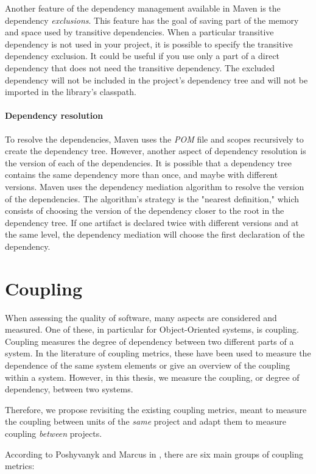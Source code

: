 Another feature of the dependency management available in Maven is the dependency \textit{exclusions}. This feature has the goal of saving part of the memory and space used by transitive dependencies. When a particular transitive dependency is not used in your project, it is possible to specify the transitive dependency exclusion. It could be useful if you use only a part of a direct dependency that does not need the transitive dependency. The excluded dependency will not be included in the project's dependency tree and will not be imported in the library's classpath.

\paragraph{Dependency resolution}
To resolve the dependencies, Maven uses the \textit{POM} file and scopes recursively to create the dependency tree. However, another aspect of dependency resolution is the version of each of the dependencies. It is possible that a dependency tree contains the same dependency more than once, and maybe with different versions. Maven uses the dependency mediation algorithm to resolve the version of the dependencies. The algorithm's strategy is the "nearest definition," which consists of choosing the version of the dependency closer to the root in the dependency tree. If one artifact is declared twice with different versions and at the same level, the dependency mediation will choose the first declaration of the dependency.

\section{Coupling}\label{section:bg-coupling}
When assessing the quality of software, many aspects are considered and measured. One of these, in particular for Object-Oriented systems, is coupling. Coupling measures the degree of dependency between two different parts of a system. In the literature of coupling metrics, these have been used to measure the dependence of the same system elements or give an overview of the coupling within a system. However, in this thesis, we measure the coupling, or degree of dependency, between two systems.

Therefore, we propose revisiting the existing coupling metrics, meant to measure the coupling between units of the \textit{same} project and adapt them to measure coupling \textit{between} projects.

\blankl
According to Poshyvanyk and Marcus in \cite{poshyvanyk2006conceptual}, there are six main groups of coupling metrics:

